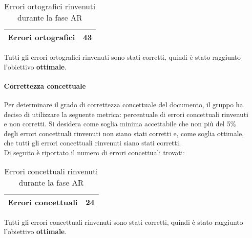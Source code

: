 \documentclass[PianoDiQualifica.tex]{subfiles}
\begin{document}
				\begin{table}[h]
				\centering
				\begin{tabular}{l c}
					\hline
					\rule[0cm]{0cm}{0.4cm}
					Errori ortografici & 43 \\
					\hline
				\end{tabular}
				\caption{Errori ortografici rinvenuti durante la fase AR}
			\end{table}		
			
			Tutti gli errori ortografici rinvenuti sono stati corretti, quindi è stato
raggiunto l’obiettivo \textbf{ottimale}.
				
				
		\paragraph{Correttezza concettuale}
		Per determinare il grado di correttezza concettuale del documento, il gruppo ha deciso di utilizzare la seguente metrica: percentuale di errori concettuali rinvenuti e non corretti.
				Si desidera come soglia minima accettabile che non più del 5\% degli errori concettuali rinvenuti non siano stati corretti e, come soglia ottimale, che tutti gli errori
				concettuali rinvenuti siano stati corretti.\\
				Di seguito è riportato il numero di errori concettuali trovati:\\
				
					\begin{table}[h]
				\centering
				\begin{tabular}{l c}
					\hline
					\rule[0cm]{0cm}{0.4cm}
					Errori concettuali & 24 \\
					\hline
				\end{tabular}
				\caption{Errori concettuali rinvenuti durante la fase AR}
			\end{table}	
			
			Tutti gli errori concettuali rinvenuti sono stati corretti, quindi è stato
raggiunto l’obiettivo \textbf{ottimale}.
\end{document}
